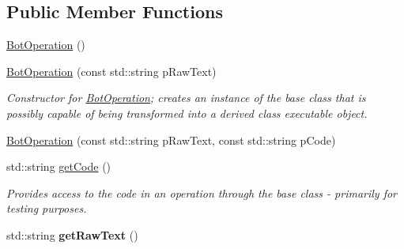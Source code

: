 \subsection*{Public Member Functions}
\begin{DoxyCompactItemize}
\item 
\hyperlink{classBotOperation_ad228493f79c0183fe28477e553bae00c}{Bot\-Operation} ()
\item 
\hyperlink{classBotOperation_a05997cf0f5d8b6d8a0621f6ccfd463ae}{Bot\-Operation} (const std\-::string p\-Raw\-Text)
\begin{DoxyCompactList}\small\item\em Constructor for \hyperlink{classBotOperation}{Bot\-Operation}; creates an instance of the base class that is possibly capable of being transformed into a derived class executable object. \end{DoxyCompactList}\item 
\hyperlink{classBotOperation_a4acc1fc67e0bbbbda2df061c77b67bfa}{Bot\-Operation} (const std\-::string p\-Raw\-Text, const std\-::string p\-Code)
\item 
std\-::string \hyperlink{classBotOperation_a768d7dabd43ccbabb72c4ed10dd98ffa}{get\-Code} ()
\begin{DoxyCompactList}\small\item\em Provides access to the code in an operation through the base class -\/ primarily for testing purposes. \end{DoxyCompactList}\item 
\hypertarget{classBotOperation_af178b91062e8844822122599331dfd0b}{std\-::string {\bfseries get\-Raw\-Text} ()}\label{classBotOperation_af178b91062e8844822122599331dfd0b}


\end{DoxyCompactItemize}
